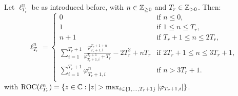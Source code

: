 \documentclass{article}
\begin{document}

  \begin{theorem} \label{thm:2-main}
    Let $\ell_{T_r}^{n}$ be as introduced before, with $n \in \mathbb{Z}_{\geq 0}$ and $T_r \in \mathbb{Z}_{> 0}$. Then:
    \begin{equation}
      \ell_{T_r}^{n} = 
      \left\{
        \begin{array}{ll}
          0 & \mbox{if } n \leq 0, \\
          1 & \mbox{if } 1 \leq n \leq T_r, \\
          n+1 & \mbox{if } T_r + 1 \leq n \leq 2T_r, \\
          \sum_{i=1}^{T_r + 1} \frac{\varphi_{T_r + 1, i}^{T_r + 1 + n}}
          {\varphi_{T_r + 1, i}^{T_r + 1} + T_r} - 2T_r^2 + n T_r 
          & \mbox{if } 2T_r + 1 \leq n \leq 3T_r + 1, \\
          \sum_{i=1}^{T_r + 1} \varphi_{T_r + 1, i}^n
          & \mbox{if } n > 3T_r + 1. \\
        \end{array}
      \right.  
    \end{equation}
    with $\textnormal{ROC}(\ell_{T_r}^n) = \{z \in \mathbb C: |z| > \max_{i \in \{1, \dots, T_r + 1\}} |\varphi_{T_r + 1, i}|\}$.
  \end{theorem}
\end{document}
